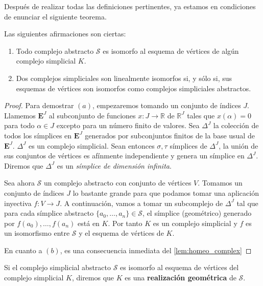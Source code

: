 Después de realizar todas las definiciones pertinentes, ya estamos en condiciones de enunciar el 
siguiente teorema.

\begin{teorema}
	Las siguientes afirmaciones son ciertas:
	\begin{enumerate}[label=(\alph*)]
		\item Todo complejo abstracto $\mathcal{S}$ es isomorfo al esquema de vértices de algún 
		complejo simplicial $K$.
		\item Dos complejos simpliciales son linealmente isomorfos si, y sólo si, sus esquemas 
		de vértices son isomorfos como complejos simpliciales abstractos.
	\end{enumerate}
\end{teorema}
\begin{proof}
	Para demostrar $(a)$, empezaremos tomando un conjunto de índices $J$. Llamemos $\mathbf{E}^J$ 
	al subconjunto de funciones $x: J \rightarrow \mathbb{R}$ de $\mathbb{R}^J$ tales que $x(\alpha) = 0$ 
	para todo $\alpha \in J$ excepto para un número finito de valores. Sea $\Delta^J$ la 
	colección de todos los símplices en $\mathbf{E}^J$ generados por subconjuntos finitos de 
	la base usual de $\mathbf{E}^J$. $\Delta^J$ es un complejo simplicial. 
	Sean entonces $\sigma, \tau$ símplices de $\Delta^J$, la 
	unión de sus conjuntos de vértices es afínmente independiente y genera un símplice en $\Delta^J$.
	Diremos que $\Delta^J$ es un \textit{símplice de dimensión infinita}.
	
	Sea ahora $\mathcal{S}$ un complejo abstracto con conjunto de vértices $V$. Tomamos un conjunto 
	de índices $J$ lo bastante grande para que podamos tomar una aplicación inyectiva 
	$f: V \rightarrow J$. A continuación, vamos a tomar un subcomplejo de $\Delta^J$ tal que para 
	cada símplice abstracto $\{a_0, \dots, a_n\} \in \mathcal{S}$, el símplice (geométrico) generado 
	por $f(a_0), \dots, f(a_n)$ está en $K$. Por tanto $K$ es un complejo simplicial y 
	$f$ es un isomorfismo entre $\mathcal{S}$ y el esquema de vértices de $K$.
	
	En cuanto a $(b)$, es una consecuencia inmediata del \autoref{lem:homeo_complex}
\end{proof}

\begin{definicion}
	Si el complejo simplicial abstracto $\mathcal{S}$ es isomorfo al esquema de vértices del 
	complejo simplicial $K$, diremos que $K$ es una \textbf{realización geométrica} de $\mathcal{S}$.
\end{definicion}


